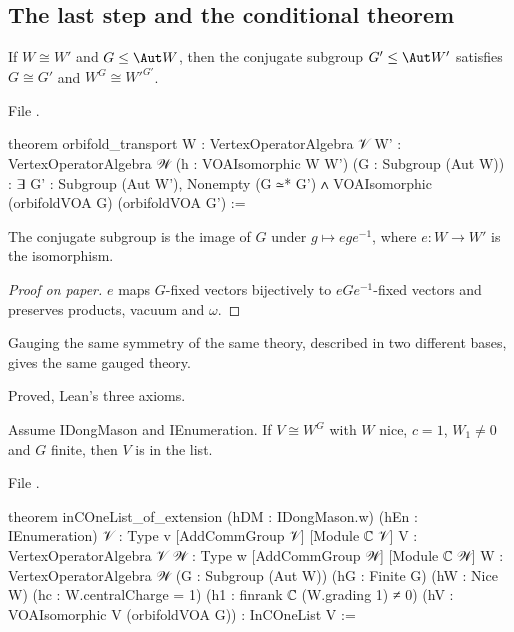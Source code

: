 \subsection{The last step and the conditional theorem}

\begin{theorem}\label{l22:thm:transport}
If $W\cong W'$ and $G\le\Aut W$, then the conjugate subgroup $G'\le\Aut W'$ satisfies $G\cong G'$ and
$W^G\cong W'^{G'}$.
\end{theorem}
\noindent File .
\begin{leancode}
theorem orbifold_transport {W : VertexOperatorAlgebra 𝒱} {W' : VertexOperatorAlgebra 𝒲}
    (h : VOAIsomorphic W W') (G : Subgroup (Aut W)) :
    ∃ G' : Subgroup (Aut W'), Nonempty (G ≃* G') ∧
      VOAIsomorphic (orbifoldVOA G) (orbifoldVOA G') :=
\end{leancode}

\begin{dictionary}
The conjugate subgroup is the image of $G$ under $g\mapsto e g e^{-1}$, where $e:W\to W'$ is the isomorphism.
\end{dictionary}

\begin{proof}[Proof on paper]
$e$ maps $G$-fixed vectors bijectively to $eGe^{-1}$-fixed vectors and preserves products, vacuum and $\omega$.
\end{proof}

\begin{physics}
Gauging the same symmetry of the same theory, described in two different bases, gives the same gauged theory.
\end{physics}

\begin{status}
Proved, Lean's three axioms.
\end{status}

\begin{theorem}\label{l22:thm:lastStep}
Assume \textup{IDongMason} and \textup{IEnumeration}. If $V\cong W^G$ with $W$ nice, $c=1$, $W_1\ne0$ and $G$
finite, then $V$ is in the list.
\end{theorem}
\noindent File .
\begin{leancode}
theorem inCOneList_of_extension (hDM : IDongMason.{w}) (hEn : IEnumeration)
    {𝒱 : Type v} [AddCommGroup 𝒱] [Module ℂ 𝒱] {V : VertexOperatorAlgebra 𝒱}
    {𝒲 : Type w} [AddCommGroup 𝒲] [Module ℂ 𝒲] {W : VertexOperatorAlgebra 𝒲}
    (G : Subgroup (Aut W)) (hG : Finite G) (hW : Nice W) (hc : W.centralCharge = 1)
    (h1 : finrank ℂ (W.grading 1) ≠ 0) (hV : VOAIsomorphic V (orbifoldVOA G)) :
    InCOneList V :=
\end{leancode}

